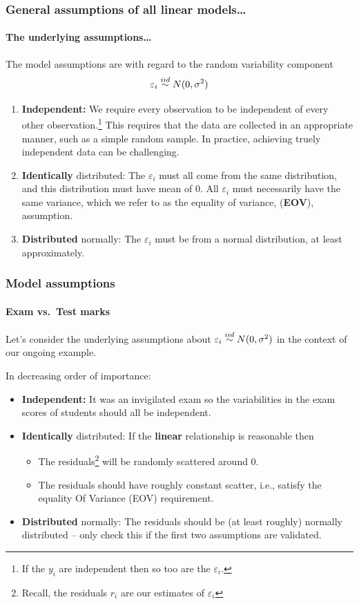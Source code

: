 \documentclass{beamer}\usepackage[]{graphicx}\usepackage[]{xcolor}
\begin{document}
\begin{frame}[fragile]
\frametitle{General assumptions of all linear models\ldots}
\framesubtitle{The underlying assumptions\ldots}
The model assumptions are with regard to the random variability component
\[
\varepsilon_i \stackrel{iid}{\sim} N(0, \sigma^2)
\]
\vspace{-2em}

\begin{enumerate}
\item \textbf{Independent:} We require every observation to be independent of every other observation.\footnote{If the $y_i$ are independent then so too are the $\varepsilon_i$.} This requires that the data are collected in an appropriate manner, such as a simple random sample. In practice, achieving truely independent data can be challenging.
\smallskip

\item \textbf{Identically} distributed: The $\varepsilon_i$ must all come from the same distribution, and this distribution must have mean of 0. All $\varepsilon_i$ must necessarily have the same variance, which we refer to as the equality of variance, (\textbf{EOV}), assumption. 
\smallskip

\item \textbf{Distributed} normally: The $\varepsilon_i$ must be from a normal distribution, at least approximately.
\end{enumerate}

\end{frame}




\begin{frame}[fragile]
\frametitle{Model assumptions}
\framesubtitle{Exam vs.\ Test marks}
Let's consider the underlying assumptions about $\varepsilon_i \stackrel{iid}{\sim} N(0,\sigma^2)$ in the context of our ongoing example.  

In decreasing order of importance:

\begin{itemize}
\item \textbf{Independent:} It was an invigilated exam so the variabilities in the exam scores of students should all be independent. 

\item \textbf{Identically} distributed: If the {\bf linear} relationship is reasonable then
\begin{itemize} 
\item  The residuals\footnote{Recall, the residuals $r_i$ are our estimates of $\varepsilon_i$} will be randomly scattered around 0.
\item The residuals should have roughly constant scatter, i.e., satisfy the equality Of Variance (EOV) requirement.
\end{itemize}

\item \textbf{Distributed} normally: The residuals should be (at least roughly) normally distributed -- only check this if the first two assumptions are validated.
\end{itemize}

\end{frame}
\end{document}
